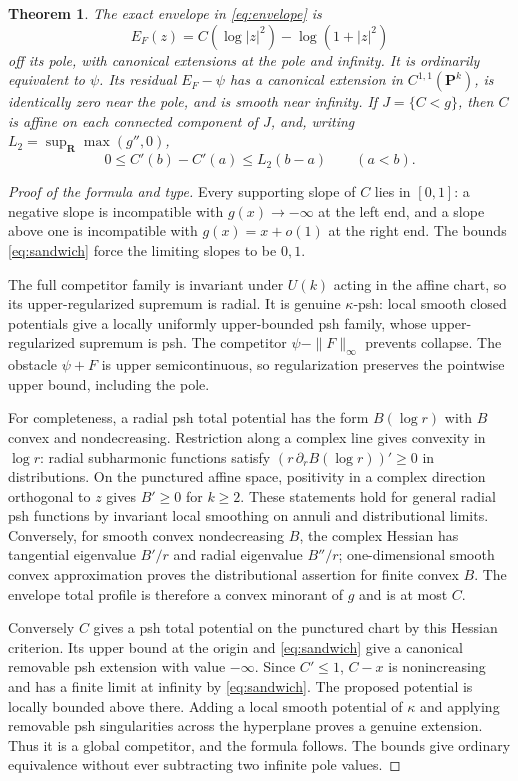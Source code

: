 \documentclass[11pt]{article}
\newtheorem{theorem}{Theorem}
\theoremstyle{remark}\newtheorem{remark}[theorem]{Remark}
\begin{document}
\begin{theorem}\label{th:main}
The exact envelope in \eqref{eq:envelope} is
\[
 E_F(z)=C(\log|z|^2)-\log(1+|z|^2)
\]
off its pole, with canonical extensions at the pole and infinity.
It is ordinarily equivalent to $\psi$. Its residual $E_F-\psi$ has a
canonical extension in $C^{1,1}(\mathbf P^k)$, is identically zero
near the pole, and is smooth near infinity.
If $J=\{C<g\}$, then $C$ is affine on each connected component of $J$,
and, writing $L_2=\sup_{\mathbf R}\max(g'',0)$,
\begin{equation}\label{eq:quantitative}
 0\leq C'(b)-C'(a)\leq L_2(b-a)\qquad(a<b).
\end{equation}
\end{theorem}
\begin{proof}[Proof of the formula and type]
Every supporting slope of $C$ lies in $[0,1]$: a negative slope is
incompatible with $g(x)\to-\infty$ at the left end, and a slope above
one is incompatible with $g(x)=x+o(1)$ at the right end.
The bounds \eqref{eq:sandwich} force the limiting slopes to be $0,1$.

The full competitor family is invariant under $U(k)$ acting in the affine
chart, so its upper-regularized supremum is radial. It is genuine
$\kappa$-psh: local smooth closed potentials give a locally uniformly
upper-bounded psh family, whose upper-regularized supremum is psh.
The competitor $\psi-\|F\|_\infty$ prevents collapse. The obstacle
$\psi+F$ is upper semicontinuous, so regularization preserves the
pointwise upper bound, including the pole.

For completeness, a radial psh total potential has the form $B(\log r)$
with $B$ convex and nondecreasing. Restriction along a complex line gives
convexity in $\log r$: radial subharmonic functions satisfy
$(r\,\partial_r B(\log r))'\geq0$ in distributions.
On the punctured affine space, positivity in a complex direction
orthogonal to $z$ gives $B'\geq0$ for $k\geq2$.
These statements hold for general radial psh functions by invariant
local smoothing on annuli and distributional limits. Conversely, for
smooth convex nondecreasing $B$, the complex Hessian has tangential
eigenvalue $B'/r$ and radial eigenvalue $B''/r$; one-dimensional smooth
convex approximation proves the distributional assertion for finite
convex $B$. The envelope total profile is therefore a convex minorant
of $g$ and is at most $C$.

Conversely $C$ gives a psh total potential on the punctured chart by
this Hessian criterion. Its upper bound at the origin and
\eqref{eq:sandwich} give a canonical removable psh extension with value
$-\infty$. Since $C'\leq1$, $C-x$ is nonincreasing and has a finite
limit at infinity by \eqref{eq:sandwich}. The proposed potential is
locally bounded above there. Adding a local smooth potential of
$\kappa$ and applying removable psh singularities across the
hyperplane proves a genuine extension. Thus it is a global competitor,
and the formula follows. The bounds give ordinary equivalence without
ever subtracting two infinite pole values.
\end{proof}
\end{document}
